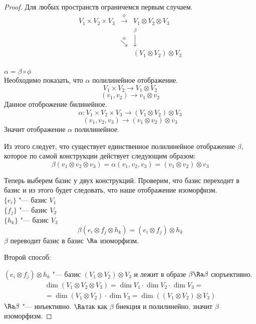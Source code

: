 \begin{proof}
Для любых пространств ограничемся первым случаем. 
$$
\begin{matrix}
V_1 \times V_2 \times V_3& \overset{\phi}{\rightarrow}& V_1 \otimes V_2 \otimes V_3\\
&\overset{\alpha}{\searrow}&\overset{\beta}{\downarrow}\\
&&(V_1 \otimes V_2) \otimes V_3\\
\end{matrix}
$$

$\alpha = \beta \circ \phi$ \\
Необходимо показать, что $\alpha$ полилинейное отображение.\\ 

$$V_1 \times V_2 \to V_1 \otimes V_2$$
$$(v_1, v_2) \to v_1 \otimes v_2$$
Данное отоброжение билинейное. 
$$\alpha \colon V_1 \times V_2 \times V_3 \to (V_1 \otimes V_2) \otimes V_3$$
$$(v_1, v_2, v_3) \to  (v_1 \otimes v_2) \otimes v_3$$
Значит отображение $\alpha$ полилинейное.

Из этого следует, что существует единственное полилинейное отображение $\beta$, которое по самой
конструкции  действует следующим образом:
$$\beta(v_1 \otimes v_2 \otimes v_3) = \alpha(v_1, v_2, v_3) = (v_1 \otimes v_2) \otimes v_3$$

Теперь выберем базис у двух конструкций. Проверим, что базис переходит 
в базис и из этого будет следовать, что наше отображение изоморфизм.\\ 
$\{e_i\}$ "--- базис $V_1$\\             
$\{f_j\}$ "--- базис $V_2$\\
$\{h_k\}$ "--- базис $V_3$\\
$$\beta(e_i \otimes f_j \otimes h_k) = (e_i \otimes f_j) \otimes h_k$$
$\beta$ переводит базис в базис $\Ra$ изоморфизм.

Второй способ:

$(e_i \otimes f_j) \otimes h_k$ "--- базис $(V_1 \otimes V_2) \otimes V_3$
и лежит в образе $\beta \Ra \beta$ сюръективно.
\begin{gather*}
\dim(V_1 \otimes V_2 \otimes V_3) = \dim V_1 \cdot \dim V_2 \cdot \dim V_3 =\\
=\dim(V_1 \otimes V_2) \cdot \dim V_3 = \dim((V_1 \otimes V_2) \otimes V_3)
\end{gather*}
$\Ra \beta$ "--- инъективно.
$\Ra$так как $\beta$ биекция и полилинейно, значит $\beta$ изоморфизм.
\end{proof}

